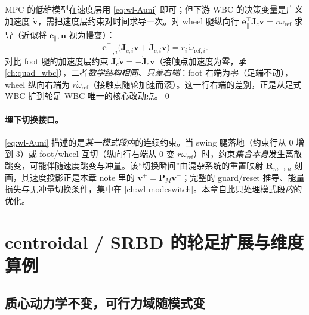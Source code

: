 \begin{derivation}
MPC 的低维模型在速度层用 \cref{eq:wl-Auni} 即可；但下游 WBC 的决策变量是广义加速度 $\dot{\mathbf{v}}$，需把速度层约束对时间求导一次。对 wheel 腿纵向行 $\mathbf{e}_\parallel^\top\mathbf{J}_c\mathbf{v}=r\omega_{\mathrm{ref}}$ 求导（近似将 $\mathbf{e}_\parallel,\mathbf{n}$ 视为慢变）：
\begin{equation}
  \mathbf{e}_{\parallel,i}^\top\big(\mathbf{J}_{c,i}\dot{\mathbf{v}}+\dot{\mathbf{J}}_{c,i}\mathbf{v}\big)=r_i\,\dot{\omega}_{\mathrm{ref},i}.
  \label{eq:wl-acclevel}
\end{equation}
对比 foot 腿的加速度层约束 $\mathbf{J}_c\dot{\mathbf{v}}=-\dot{\mathbf{J}}_c\mathbf{v}$（接触点加速度为零，承 \cref{ch:quad_wbc}），二者\emph{数学结构相同、只差右端}：foot 右端为零（足端不动），wheel 纵向右端为 $r\dot\omega_{\mathrm{ref}}$（接触点随轮加速而滚）。这一行右端的差别，正是从足式 WBC 扩到轮足 WBC 唯一的核心改动点。\qed
\end{derivation}

\paragraph{埋下切换接口。}
\cref{eq:wl-Auni} 描述的是\emph{某一模式段内}的连续约束。当 swing 腿落地（约束行从 $0$ 增到 $3$）或 foot/wheel 互切（纵向行右端从 $0$ 变 $r\omega_{\mathrm{ref}}$）时，约束\emph{集合本身}发生离散跳变，可能伴随速度跳变与冲量。该“切换瞬间”由混杂系统的重置映射 $\mathbf{R}_{m\to n}$ 刻画，其速度投影正是本章 note 里的 $\mathbf{v}^+=\mathbf{P}_M\mathbf{v}^-$；完整的 guard/reset 推导、能量损失与无冲量切换条件，集中在 \cref{ch:wl-modeswitch}。本章自此只处理模式段\emph{内}的优化。

\section{centroidal / SRBD 的轮足扩展与维度算例}
\label{sec:wl-srbd}

\subsection{质心动力学不变，可行力域随模式变}

